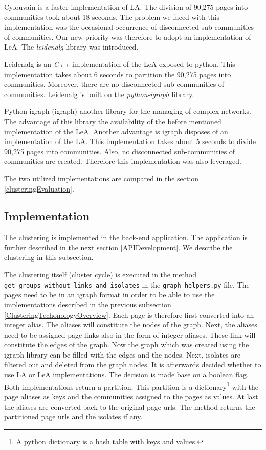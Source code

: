 Cylouvain is a faster implementation of LA. The division of 90,275 pages into communities took about 18 seconds. The problem we faced with this implementation was the occasional occurrence of disconnected sub-communities of communities. Our new priority was therefore to adopt an implementation of LeA. The \textit{leidenalg} \cite{leidenalg} library was introduced.

Leidenalg is an \textit{C++} implementation of the LeA exposed to python. This implementation takes about 6 seconds to partition the 90,275 pages into communities. Moreover, there are no disconnected sub-communities of communities. Leidenalg is built on the \textit{python-igraph} library. 

Python-igraph (igraph) another library for the managing of complex networks. The advantage of this library the availability of the before mentioned implementation of the LeA. Another advantage is igraph disposes of an implementation of the LA. This implementation takes about 5 seconds to divide 90,275 pages into communities. Also, no disconnected sub-communities of communities are created. Therefore this implementation was also leveraged.

The two utilized implementations are compared in the section \ref{clusteringEvaluation}.

\subsection{Implementation} \label{ClusteringImplementation}
The clustering is implemented in the back-end application. The application is further described in the next section \ref{APIDevelopment}. We describe the clustering in this subsection. 

The clustering itself (cluster cycle) is executed in the method \\ \texttt{get\_groups\_without\_links\_and\_isolates} in the \texttt{graph\_helpers.py} file. The pages need to be in an igraph format in order to be able to use the implementations described in the previous subsection \ref{ClusteringTechonologyOverview}. Each page is therefore first converted into an integer alias. The aliases will constitute the nodes of the graph. Next, the aliases need to be assigned page links also in the form of integer aliases. These link will constitute the edges of the graph. Now the graph which was created using the igraph library can be filled with the edges and the nodes. Next, isolates are filtered out and deleted from the graph nodes. It is afterwards decided whether to use LA or LeA implementations. The decision is made base on a boolean flag. Both implementations return a partition. This partition is a dictionary\footnote{A python dictionary is a hash table with keys and values.} with the page aliases as keys and the communities assigned to the pages as values. At last the aliases are converted back to the original page urls. The method returns the partitioned page urls and the isolates if any.

